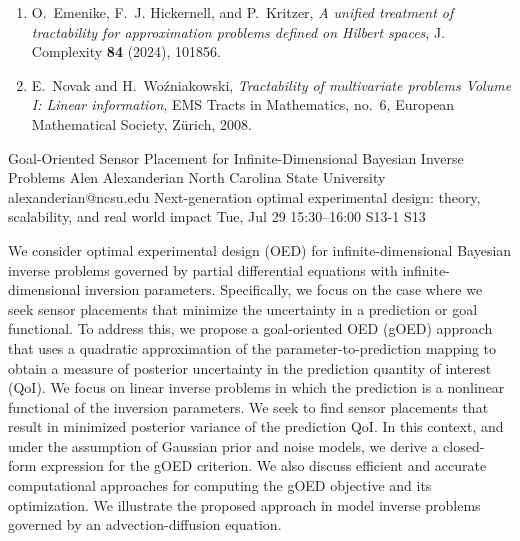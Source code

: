 \documentclass[12pt,lettersize,oneside]{book} %
\begin{document}
\begin{talk}
\begin{enumerate}
 \item
O.~Emenike, F.~J. Hickernell, and P.~Kritzer, \emph{A unified treatment of tractability for approximation problems defined on {H}ilbert spaces}, J. Complexity \textbf{84} (2024), 101856.

\item 
E.~Novak and H.~Wo{\'{z}}niakowski, \emph{Tractability of multivariate problems {V}olume {I}: {L}inear information}, EMS Tracts in Mathematics, no.~6, European Mathematical Society, Z\"urich, 2008.

\end{enumerate}


\end{talk}

\begin{talk}
  {Goal-Oriented Sensor Placement for Infinite-Dimensional Bayesian Inverse Problems}%
  {Alen Alexanderian}%
  {North Carolina State University}%
  {alexanderian@ncsu.edu}%
  {Next-generation optimal experimental design: theory, scalability, and real world impact}%
  {}%
  {Tue, Jul 29 15:30--16:00}%
  {S13-1}%
  {S13}%
    
   
We consider optimal experimental design (OED) for infinite-dimensional Bayesian
inverse problems governed by partial differential equations with
infinite-dimensional inversion parameters.  Specifically, we focus on the case
where we seek sensor placements that minimize the uncertainty in a prediction or
goal functional.  To address this, we propose a goal-oriented OED (gOED)
approach that uses a quadratic approximation of the parameter-to-prediction
mapping to obtain a measure of posterior uncertainty in the prediction quantity
of interest (QoI).  We focus on linear inverse problems in which the prediction
is a nonlinear functional of the inversion parameters. We seek to find sensor
placements that result in minimized posterior variance of the prediction QoI. In
this context, and under the assumption of Gaussian prior and noise models, we
derive a closed-form expression for the gOED criterion. We also discuss
efficient and accurate computational approaches for computing the gOED objective
and its optimization.  We illustrate the proposed approach in model inverse
problems governed by an advection-diffusion equation.

\medskip

\end{talk}
\end{document}
